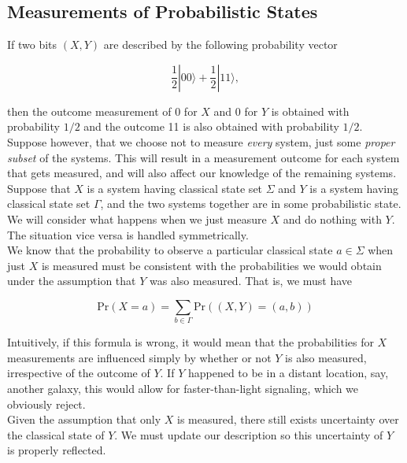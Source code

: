 \documentclass[svgnames]{article}     %
\begin{document}
\subsection{Measurements of Probabilistic States}

If two bits $(X, Y)$ are described by the following probability vector 

\[
\frac{1}{2}|00\rangle + \frac{1}{2}|11\rangle , 
\] \vspace{5px}

then the outcome measurement of 0 for $X$ and 0 for $Y$ is obtained with
probability $1/2$ and the outcome 11  is also obtained with probability $1/2$.
\\

Suppose however, that we choose not to measure \textit{every} system, just some
\textit{proper subset} of the systems. This will result in a measurement
outcome for each system that gets measured, and will also affect our knowledge
of the remaining systems. \\ 

Suppose that $X$ is a system having classical state set $\Sigma$ and  $Y$ is
a system having classical state set $\Gamma$, and the two systems together are
in some probabilistic state. We will consider what happens when we just measure
$X$ and do nothing with $Y$. The situation vice versa is handled symmetrically.
\\

We know that the probability to observe a particular classical state
$a\in\Sigma$ when just $X$ is measured must be consistent with the
probabilities we would obtain under the assumption that $Y$ was also measured.
That is, we must have

\[
  \text{Pr} (X = a) = \sum_{b\in\Gamma} \text{Pr} ((X, Y) = (a, b))
\] \vspace{5px}

Intuitively, if this formula is wrong, it would mean that the probabilities for
$X$ measurements are influenced simply by whether or not $Y$ is also measured,
irrespective of the outcome of $Y$. If $Y$ happened to be in a distant
location, say, another galaxy, this would allow for faster-than-light
signaling, which we obviously reject. \\

Given the assumption that only $X$ is measured, there still exists uncertainty
over the classical state of $Y$. We must update our description so this
uncertainty of  $Y$ is properly reflected. \\
\end{document}
